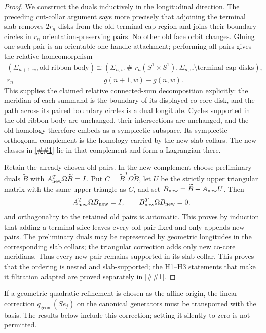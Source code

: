 \documentclass[11pt]{article}
\newcommand{\cref}[1]{\autoref{##1}}%
\begin{document}
\begin{proof}
We construct the duals inductively in the longitudinal direction.  The
preceding cut-collar argument says more precisely that adjoining the terminal
slab removes \(2r_n\) disks from the old terminal cap region and joins their
boundary circles in \(r_n\) orientation-preserving pairs.  No other old face
orbit changes.  Gluing one such pair is an orientable one-handle attachment;
performing all pairs gives the relative homeomorphism
\begin{align*}
 (\Sigma_{n+1,w},\text{old ribbon body})
 &\cong
 (\Sigma_{n,w}\mathbin\# r_n(S^1\!\times S^1),
  \Sigma_{n,w}\setminus\text{terminal cap disks}),\\
 r_n&=g(n+1,w)-g(n,w).
\end{align*}
This supplies the claimed relative connected-sum decomposition explicitly:
the meridian of each summand is the boundary of its displayed co-core disk,
and the path across its paired boundary circles is a dual longitude.
Cycles supported in the old ribbon body are
unchanged, their intersections are unchanged, and the old homology therefore
embeds as a symplectic subspace.  Its symplectic orthogonal complement is the
homology carried by the new slab collars.  The new classes in
\cref{eq:Ais} lie in that complement and form a Lagrangian there.

Retain the already chosen old pairs.  In the new complement choose preliminary
duals \(\widetilde B\) with
\(A_{\rm new}^T\Omega\widetilde B=I\).  Put
\(C=\widetilde B^T\Omega\widetilde B\), let \(U\) be the strictly upper
triangular matrix with the same upper triangle as \(C\), and set
\(B_{\rm new}=\widetilde B+A_{\rm new}U\).  Then
\[
 A_{\rm new}^T\Omega B_{\rm new}=I,
 \qquad B_{\rm new}^T\Omega B_{\rm new}=0,
\]
and orthogonality to the retained old pairs is automatic.  This proves by
induction that adding a terminal slice leaves every old pair fixed and only
appends new pairs.  The preliminary duals may be represented by geometric
longitudes in the corresponding slab collars; the triangular correction
adds only new co-core meridians.  Thus every new pair remains supported in
its slab collar.  This proves that the ordering is nested and slab-supported;
the H1--H3 statements that make it filtration adapted are proved separately
in \cref{lem:grid-exact}.
\end{proof}

If a geometric quadratic refinement is chosen as the affine origin, the
linear correction \(q_{\mathrm{geom}}(Se_j)\) on the canonical generators
must be transported with the basis.  The results below include this
correction; setting it silently to zero is not permitted.
\end{document}

